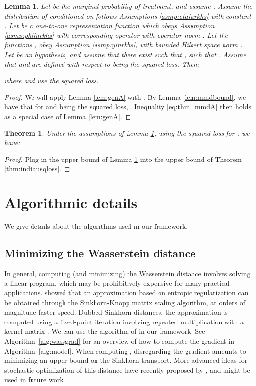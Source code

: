 \documentclass{article}
\newtheorem{thmappthm}{Theorem}
\newtheorem{thmapplem}{Lemma}
\begin{document}
\begin{thmapplem}\label{thm:mmdA}
Let  be the marginal probability of treatment, and assume . Assume the distribution of  conditioned on  follows Assumptions \ref{asmp:etainrkhs} with constant .
Let  be a one-to-one representation function which obeys Assumption \ref{asmp:phiinrkhs} with corresponding operator  with operator norm . Let the functions ,  obey Assumption \ref{asmp:yinrkhs}, with bounded Hilbert space norm  . Let  be an hypothesis, and assume that there exist  such that , such that . Assume that  and  are defined with respect to  being the squared loss. Then:

where  and  use the squared loss.
\end{thmapplem}
\begin{proof}
We will apply Lemma \ref{lem:genA} with . By Lemma \ref{lem:mmdbound}, we have that for  and  being the squared loss, . Inequality \eqref{eq:thm_mmdA} then holds as a special case of Lemma \ref{lem:genA}.
\end{proof}

\begin{thmappthm}
Under the assumptions of Lemma \ref{thm:mmdA}, using the squared loss for , we have:

\end{thmappthm}
\begin{proof}
Plug in the upper bound of Lemma \ref{thm:mmdA} into the upper bound of Theorem \ref{thm:indtausqloss}.
\end{proof}
 \section{Algorithmic details}\label{sec:appmodel}

We give details about the algorithms used in our framework. 



\subsection{Minimizing the Wasserstein distance}
In general, computing (and minimizing) the Wasserstein distance involves solving a linear program, which may be prohibitively expensive for many practical applications. \citet{cuturi2013sinkhorn} showed that an approximation based on entropic regularization can be obtained through the Sinkhorn-Knopp matrix scaling algorithm, at orders of magnitude faster speed. Dubbed Sinkhorn distances, the approximation is computed using a fixed-point iteration involving repeated multiplication with a kernel matrix . We can use the algorithm of \citet{cuturi2013sinkhorn} in our framework. See Algorithm~\ref{alg:wassgrad} for an overview of how to compute the gradient  in Algorithm~\ref{alg:model}. When computing , disregarding the gradient  amounts to minimizing an upper bound on the Sinkhorn transport. More advanced ideas for stochastic optimization of this distance have recently proposed by \citet{aude2016stochastic}, and might be used in future work.
\end{document}
